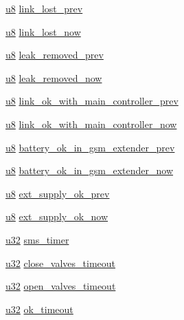 \begin{DoxyCompactItemize}
\item 
\hyperlink{types_8h_aed742c436da53c1080638ce6ef7d13de}{u8} \hyperlink{struct_state___type_def_a8126cdefa896668d73970a1dd9192565}{link\+\_\+lost\+\_\+prev}
\item 
\hyperlink{types_8h_aed742c436da53c1080638ce6ef7d13de}{u8} \hyperlink{struct_state___type_def_a9ac2edc0df6c714d6e3496ef4f405a1a}{link\+\_\+lost\+\_\+now}
\item 
\hyperlink{types_8h_aed742c436da53c1080638ce6ef7d13de}{u8} \hyperlink{struct_state___type_def_a29b1eb73e61f2af9dff661d4eed37127}{leak\+\_\+removed\+\_\+prev}
\item 
\hyperlink{types_8h_aed742c436da53c1080638ce6ef7d13de}{u8} \hyperlink{struct_state___type_def_ac81248e2a38e0bb3be3f1579a561d88f}{leak\+\_\+removed\+\_\+now}
\item 
\hyperlink{types_8h_aed742c436da53c1080638ce6ef7d13de}{u8} \hyperlink{struct_state___type_def_a5a889f31f5aef8bc9cdaf35dcbaa8965}{link\+\_\+ok\+\_\+with\+\_\+main\+\_\+controller\+\_\+prev}
\item 
\hyperlink{types_8h_aed742c436da53c1080638ce6ef7d13de}{u8} \hyperlink{struct_state___type_def_af92b3225c318bb7826705f226cf2d526}{link\+\_\+ok\+\_\+with\+\_\+main\+\_\+controller\+\_\+now}
\item 
\hyperlink{types_8h_aed742c436da53c1080638ce6ef7d13de}{u8} \hyperlink{struct_state___type_def_a66f49ea1fbbefe2fdfb046846068881c}{battery\+\_\+ok\+\_\+in\+\_\+gsm\+\_\+extender\+\_\+prev}
\item 
\hyperlink{types_8h_aed742c436da53c1080638ce6ef7d13de}{u8} \hyperlink{struct_state___type_def_ab5a5c5936bd1930a9701582da53248b0}{battery\+\_\+ok\+\_\+in\+\_\+gsm\+\_\+extender\+\_\+now}
\item 
\hyperlink{types_8h_aed742c436da53c1080638ce6ef7d13de}{u8} \hyperlink{struct_state___type_def_a88e14ab5e1586e01e5c3cd6575d2760a}{ext\+\_\+supply\+\_\+ok\+\_\+prev}
\item 
\hyperlink{types_8h_aed742c436da53c1080638ce6ef7d13de}{u8} \hyperlink{struct_state___type_def_ad90189098ebb9488537d88ce9952902f}{ext\+\_\+supply\+\_\+ok\+\_\+now}
\item 
\hyperlink{types_8h_a0ceed739f3b2b55ee8d4d2a79a82cdea}{u32} \hyperlink{struct_state___type_def_a8d557afc972ad5ba00feb8879859ae1c}{sms\+\_\+timer}
\item 
\hyperlink{types_8h_a0ceed739f3b2b55ee8d4d2a79a82cdea}{u32} \hyperlink{struct_state___type_def_ad8de5314755f75e84326b693b7ef6625}{close\+\_\+valves\+\_\+timeout}
\item 
\hyperlink{types_8h_a0ceed739f3b2b55ee8d4d2a79a82cdea}{u32} \hyperlink{struct_state___type_def_ac726aa26993ec69bc1b0a13439d95fdd}{open\+\_\+valves\+\_\+timeout}
\item 
\hyperlink{types_8h_a0ceed739f3b2b55ee8d4d2a79a82cdea}{u32} \hyperlink{struct_state___type_def_a0913155dead8c624b210277a7a7894fb}{ok\+\_\+timeout}
\end{DoxyCompactItemize}


